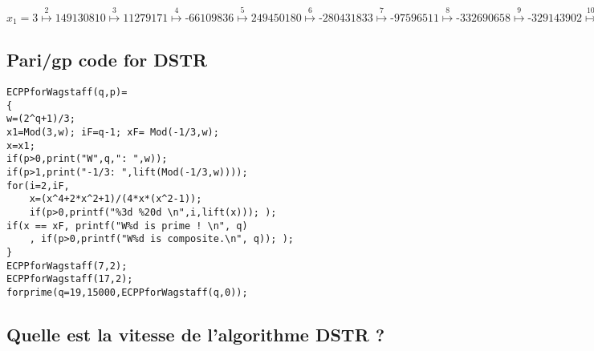 \documentclass[latin1]{quadrature}
\newif\ifenfrancais
\begin{document}
\begin{article}
\begin{article}
$x_1 = 3
\stackrel{2}{\mapsto} \text{149130810}
\stackrel{3}{\mapsto} \text{11279171}
\stackrel{4}{\mapsto} \text{-66109836}
\stackrel{5}{\mapsto} \text{249450180}
\stackrel{6}{\mapsto} \text{-280431833}
\stackrel{7}{\mapsto} \text{-97596511}
\stackrel{8}{\mapsto} \text{-332690658}
\stackrel{9}{\mapsto} \text{-329143902}
\stackrel{10}{\mapsto} \text{-88687766}
\stackrel{11}{\mapsto} \text{324996427}
\stackrel{12}{\mapsto} \text{190514966}
\stackrel{13}{\mapsto} \text{-207459777}
\stackrel{14}{\mapsto} \text{131027028}
\stackrel{15}{\mapsto} \text{36447093}
\stackrel{16}{\mapsto} \text{-245289057}
\stackrel{17}{\mapsto} \text{199095424}
\stackrel{18}{\mapsto} \text{27348828}
\stackrel{19}{\mapsto} \text{151062042}
\stackrel{20}{\mapsto} \text{106649512}
\stackrel{21}{\mapsto} \text{-28457251}
\stackrel{22}{\mapsto} \text{232233162}
\stackrel{23}{\mapsto} \text{319560515}
\stackrel{24}{\mapsto} \text{-46286542}
\stackrel{25}{\mapsto} \text{120897033}
\stackrel{26}{\mapsto} \text{167096450}
\stackrel{27}{\mapsto} \text{-279090714}
\stackrel{28}{\mapsto} \text{220510103}
\stackrel{29}{\mapsto} \text{65535}
\stackrel{30=q-1}{\mapsto} \text{238609294}  = \textbf{-1/3}
\stackrel{}{\mapsto} \text{149130810} = x_2 \dots $



\ifenfrancais
\subsection { Code Pari/gp pour DSTR }
\else
\subsection { Pari/gp code for DSTR }
\fi

\small
\begin{verbatim}
ECPPforWagstaff(q,p)=
{
w=(2^q+1)/3;
x1=Mod(3,w); iF=q-1; xF= Mod(-1/3,w);
x=x1;
if(p>0,print("W",q,": ",w));
if(p>1,print("-1/3: ",lift(Mod(-1/3,w))));
for(i=2,iF,
    x=(x^4+2*x^2+1)/(4*x*(x^2-1));
    if(p>0,printf("%3d %20d \n",i,lift(x))); );
if(x == xF, printf("W%d is prime ! \n", q)
    , if(p>0,printf("W%d is composite.\n", q)); );
}
ECPPforWagstaff(7,2);
ECPPforWagstaff(17,2);
forprime(q=19,15000,ECPPforWagstaff(q,0));
\end{verbatim}
\normalsize



\ifenfrancais
\subsection { Quelle est la vitesse de l'algorithme DSTR ? }


\end{article}
\end{article}
\end{document}
